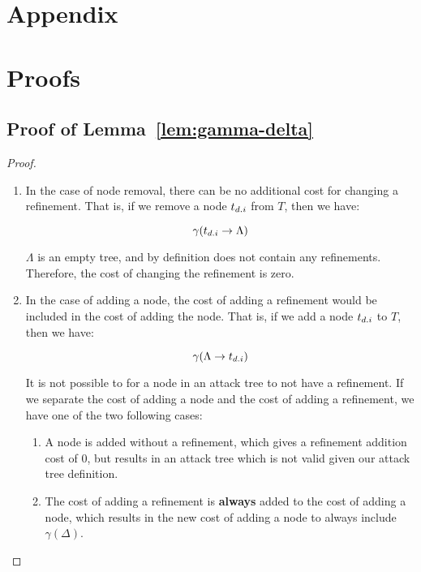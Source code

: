 \section*{Appendix}



\section{Proofs}
\label{appendix:proofs}
\subsection{Proof of Lemma~\ref{lem:gamma-delta}}
\label{appendix:lem:gamma-delta}
\begin{proof}


    \begin{enumerate}
        \item In the case of node removal, there can be no additional cost for changing a refinement. That is, if we remove a node $t_{{d}.{i}}$ from $T$, then we have:

              $$\gamma(t_{{d}.{i}} \rightarrow {\Lambda})$$

              $\Lambda$ is an empty tree, and by definition does not contain any refinements. Therefore, the cost of changing the refinement is zero.

        \item In the case of adding a node, the cost of adding a refinement would be included in the cost of adding the node. That is, if we add a node $t_{{d}.{i}}$ to $T$, then we have:

              $$\gamma(\Lambda \rightarrow {t_{{d}.{i}}})$$

              It is not possible to for a node in an attack tree to not have a refinement. If we separate the cost of adding a node and the cost of adding a refinement, we have one of the two following cases:
              \begin{enumerate}
                  \item A node is added without a refinement, which gives a refinement addition cost of 0, but results in an attack tree which is not valid given our attack tree definition.
                  \item The cost of adding a refinement is \textbf{always} added to the cost of adding a node, which results in the new cost of adding a node to always include $\gamma(\Delta)$.
              \end{enumerate}


\end{enumerate}
\end{proof}
